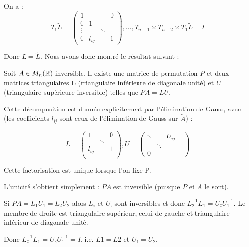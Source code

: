 On a : 
\[
    T_1 \tilde{L} =
    \begin{pmatrix}
        1      &        &        & 0 \\
        0      & 1      &        &   \\
        \vdots &        & \ddots &   \\
        0      & l_{ij} &        & 1
    \end{pmatrix}
    , \dots , T_{n-1} \times T_{n-2} \times T_1 \tilde{L} = I
\]

Donc $L = \tilde{L}$. Nous avons donc montré le résultat suivant :

\begin{ftheo}
    Soit $A \in M_n(\mathbb{R})$ inversible. Il existe une matrice de permutation $P$
et deux matrices triangulaires L (triangulaire inférieure de diagonale unité) et $U$ (triangulaire supérieure inversible) telles que $PA = LU$.

    Cette décomposition est donnée explicitement par l'élimination de Gauss, avec 
    (les coefficients $l_{ij}$ sont ceux de l'élimination de Gauss sur $\tilde{A}$) :

    \[
        L = \begin{pmatrix}
            1 & & 0 \\
            & \ddots & \\
            l_{ij} & & 1 \\
        \end{pmatrix}
        , U =
        \begin{pmatrix}
            \ddots & & U_{ij} \\
            & \ddots & & \\
            0 & &
        \end{pmatrix}
    \]

    Cette factorisation est unique lorsque l'on fixe P.
    \label{th:factoLU}
\end{ftheo}

\begin{remark}
    L'unicité s'obtient simplement :
    $PA$ est inversible (puisque $P$ et $A$ le sont).

    Si $PA = L_1 U_1 = L_2 U_2$ alors $L_i$ et $U_i$ sont inversibles et donc
    $L^{-1}_2 L_1 = U_2 U^{-1}_1$. Le membre de droite est triangulaire supérieur, celui de gauche et triangulaire inférieur de diagonale unité.

    Donc $L^{-1}_2 L_1 = U_2 U^{-1}_1 = I$, i.e. $L1 = L2$ et $U_1 = U_2$.
\end{remark}

